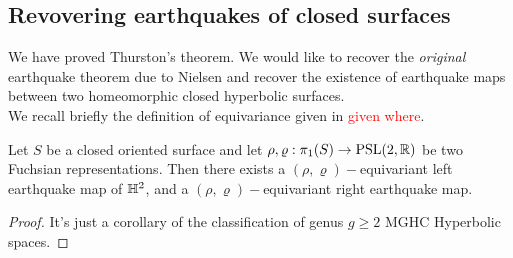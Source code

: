 \subsection{Revovering earthquakes of closed surfaces}
We have proved Thurston's theorem. We would like to recover the \textit{original} earthquake theorem due to Nielsen and recover the existence of earthquake maps between two homeomorphic closed hyperbolic surfaces.\\
We recall briefly the definition of equivariance given in \textcolor{red}{given where}. 

\begin{corollary}
    Let $S$ be a closed oriented surface and let $\rho,\varrho:\pi_1(S)\to\text{PSL}(2,\mathbb{R})$ be two Fuchsian representations. Then there exists a $(\rho,\varrho)-$equivariant left earthquake map of $\mathbb{H}^2$, and a $(\rho,\varrho)-$equivariant right earthquake map. 
\end{corollary}

\begin{proof}
    It's just a corollary of the classification of genus $g\geq 2$ MGHC Hyperbolic spaces.
\end{proof}